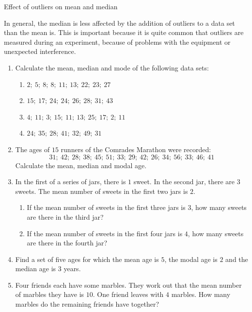 \begin{wex}{Effect of outliers on mean and median}
{  In general, the median is less affected by the addition of outliers
  to a data set than the mean is. This is important because it is
  quite common that outliers are measured during an experiment,
  because of problems with the equipment or unexpected interference.

}
\end{wex}

\begin{exercises}{}{
\begin{enumerate}[noitemsep, label=\textbf{\arabic*}.]
\item Calculate the mean, median and mode of the following data sets:
\begin{enumerate}[noitemsep, label=\textbf{(\alph*)} ]
 \item $2;~5;~8;~8;~11;~13;~22;~23;~27$
\item $15;~17;~24;~24;~26;~28;~31;~43$
\item $4;~11;~3;~15;~11;~13;~25;~17;~2;~11$
\item $24;~35;~28;~41;~32;~49;~31$
\end{enumerate}
\item The ages of $15$ runners of the Comrades Marathon were recorded:
\begin{equation*}
31;~42;~28;~38;~45;~51;~33;~29;~42;~26;~34;~56;~33;~46;~41
\end{equation*}
Calculate the mean, median and modal age.
\item In the first of a series of jars, there is $1$ sweet. In the
  second jar, there are $3$ sweets. The mean number of sweets in the
  first two jars is $2$.
\begin{enumerate}[noitemsep, label=\textbf{(\alph*)} ]
  \item If the mean number of sweets in the first three jars is $3$, how
    many sweets are there in the third jar?
  \item If the mean number of sweets in the first four jars is $4$, how
    many sweets are there in the fourth jar?
  \end{enumerate}

\item Find a set of five ages for which the mean age is $5$, the modal
  age is $2$ and the median age is $3$ years.

\item Four friends each have some marbles. They work out that the mean
  number of marbles they have is $10$. One friend leaves with $4$
  marbles. How many marbles do the remaining friends have together?


\end{enumerate}}
\end{exercises}
